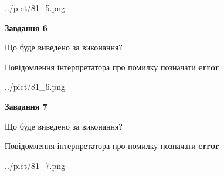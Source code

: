 \documentclass[10pt, ukrainian]{article}
\begin{document}
{\begin {large}
\begin{center}
	{../pict/81_5.png}
\end{center}
\newpage

{\begin {center}\textbf{Завдання 6}\end {center}}\par
Що буде виведено за виконання? \par
Повідомлення інтерпретатора про помилку позначати \textbf{error}

\begin{center}
	{../pict/81_6.png}
\end{center}
\newpage

{\begin {center}\textbf{Завдання 7}\end {center}}\par
Що буде виведено за виконання? \par
Повідомлення інтерпретатора про помилку позначати \textbf{error}

\begin{center}
	{../pict/81_7.png}
\end{center}
\newpage

\end {large}}
\end{document}
